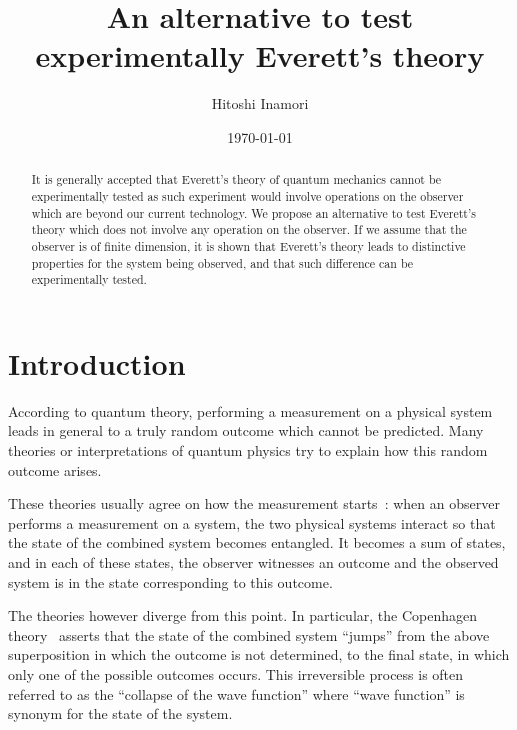 \documentclass[11pt,amsmath,amssymb,latexsym,a4paper]{article}
\newcommand{\highlight}[1] {#1}
\begin{document}
\title{\highlight{An alternative} to test experimentally Everett's theory}
\author{Hitoshi Inamori\\
}

\bigskip

\date{\today}


\maketitle

\begin{abstract}
It is generally accepted that Everett's theory of quantum mechanics cannot be experimentally tested as such experiment would involve operations on the observer which are beyond our current technology. We propose an alternative to test Everett's theory which does not involve any operation on the observer. If we assume that the observer is of finite dimension, it is shown that Everett's theory leads to distinctive properties for the system being observed, and that such difference can be experimentally tested. 
   

\bigskip


\end{abstract}

\section{Introduction}  

According to quantum theory, performing a measurement on a physical system leads in general to a truly random outcome which cannot be predicted. Many theories or interpretations of quantum physics try to explain how this random outcome arises. 

These theories usually agree on how the measurement starts~\cite{vonNeumann}: when an observer performs a measurement on a system, the two physical systems interact so that the state of the combined system becomes entangled. It becomes a sum of states, and in each of these states, the observer witnesses an outcome and the observed system is in the state corresponding to this outcome.

The theories however diverge from this point. In particular, the Copenhagen theory~\cite{Copenhagen} asserts that the state of the combined system ``jumps'' from the above superposition in which the outcome is not \highlight{determined}, to the final state, in which only one of the possible outcomes occurs. This irreversible process is often referred to as the ``collapse of the wave function'' where ``wave function'' is synonym for the state of the system. 
\end{document}
